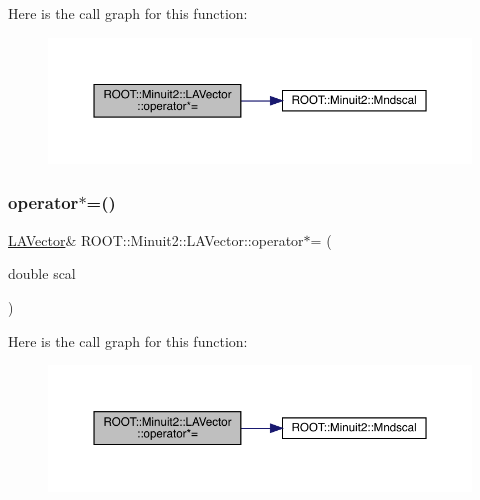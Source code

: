 Here is the call graph for this function\+:
\nopagebreak
\begin{figure}[H]
\begin{center}
\leavevmode
\includegraphics[width=350pt]{d3/d20/classROOT_1_1Minuit2_1_1LAVector_a3acb9399e2b908c080e83ccd878eb349_cgraph}
\end{center}
\end{figure}
\mbox{\label{classROOT_1_1Minuit2_1_1LAVector_a3acb9399e2b908c080e83ccd878eb349}} 
\subsubsection{\texorpdfstring{operator$\ast$=()}{operator*=()}\hspace{0.1cm}{\footnotesize\ttfamily [2/2]}}
{\footnotesize\ttfamily \mbox{\hyperlink{classROOT_1_1Minuit2_1_1LAVector}{L\+A\+Vector}}\& R\+O\+O\+T\+::\+Minuit2\+::\+L\+A\+Vector\+::operator$\ast$= (\begin{DoxyParamCaption}\item[{double}]{scal }\end{DoxyParamCaption})\hspace{0.3cm}{\ttfamily [inline]}}

Here is the call graph for this function\+:
\nopagebreak
\begin{figure}[H]
\begin{center}
\leavevmode
\includegraphics[width=350pt]{d3/d20/classROOT_1_1Minuit2_1_1LAVector_a3acb9399e2b908c080e83ccd878eb349_cgraph}
\end{center}
\end{figure}
\mbox{\label{classROOT_1_1Minuit2_1_1LAVector_ae560b2a352c80542c2333a68bc9c3b68}} 

